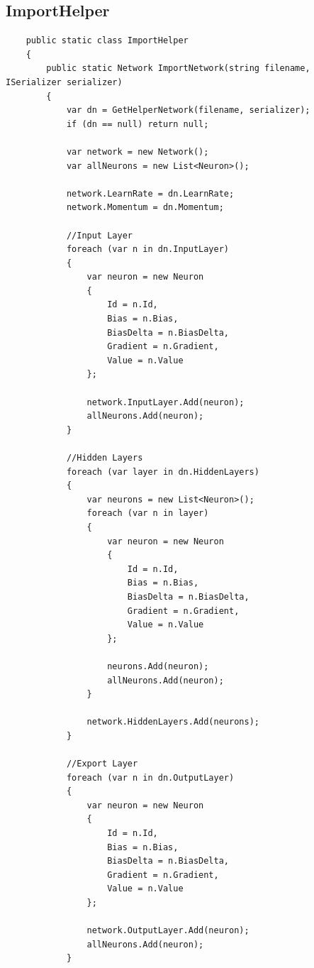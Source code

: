 \documentclass[12pt,a4paper]{article}
\begin{document}
	\subsection{ImportHelper}
	\begin{lstlisting}
	public static class ImportHelper
	{
        public static Network ImportNetwork(string filename, ISerializer serializer)
        {
            var dn = GetHelperNetwork(filename, serializer);
            if (dn == null) return null;

            var network = new Network();
            var allNeurons = new List<Neuron>();

            network.LearnRate = dn.LearnRate;
            network.Momentum = dn.Momentum;

            //Input Layer
            foreach (var n in dn.InputLayer)
            {
                var neuron = new Neuron
                {
                    Id = n.Id,
                    Bias = n.Bias,
                    BiasDelta = n.BiasDelta,
                    Gradient = n.Gradient,
                    Value = n.Value
                };

                network.InputLayer.Add(neuron);
                allNeurons.Add(neuron);
            }

            //Hidden Layers
            foreach (var layer in dn.HiddenLayers)
            {
                var neurons = new List<Neuron>();
                foreach (var n in layer)
                {
                    var neuron = new Neuron
                    {
                        Id = n.Id,
                        Bias = n.Bias,
                        BiasDelta = n.BiasDelta,
                        Gradient = n.Gradient,
                        Value = n.Value
                    };

                    neurons.Add(neuron);
                    allNeurons.Add(neuron);
                }

                network.HiddenLayers.Add(neurons);
            }

            //Export Layer
            foreach (var n in dn.OutputLayer)
            {
                var neuron = new Neuron
                {
                    Id = n.Id,
                    Bias = n.Bias,
                    BiasDelta = n.BiasDelta,
                    Gradient = n.Gradient,
                    Value = n.Value
                };

                network.OutputLayer.Add(neuron);
                allNeurons.Add(neuron);
            }


\end{lstlisting}
\end{document}
